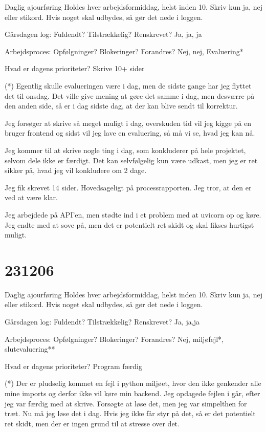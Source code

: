 \documentclass{report}
\begin{document}
Daglig ajourføring
Holdes hver arbejdsformiddag, helst inden 10. Skriv kun ja, nej eller stikord. Hvis noget skal udbydes, så gør det nede i loggen.
 
Gårsdagen log: Fuldendt? Tilstrækkelig? Renskrevet?
Ja, ja, ja
 
Arbejdsproces: Opfølgninger? Blokeringer? Forandres?
Nej, nej, Evaluering*
 
Hvad er dagens prioriteter?
Skrive 10+ sider
 
(*) Egentlig skulle evalueringen være i dag, men de sidste gange har jeg flyttet det til onsdag. Det ville give mening at gøre det samme i dag, men desværre på den anden side, så er i dag sidste dag, at der kan blive sendt til korrektur.
 
Jeg forsøger at skrive så meget muligt i dag, overskuden tid vil jeg kigge på en bruger frontend og sidst vil jeg lave en evaluering, så må vi se, hvad jeg kan nå.
 
Jeg kommer til at skrive nogle ting i dag, som konkluderer på hele projektet, selvom dele ikke er færdigt.
Det kan selvfølgelig kun være udkast, men jeg er ret sikker på, hvad jeg vil konkludere om 2 dage.
 
Jeg fik skrevet 14 sider. Hovedsageligt på processrapporten.
Jeg tror, at den er ved at være klar.
 
Jeg arbejdede på API'en, men stødte ind i et problem med at uvicorn op og køre. Jeg endte med at sove på, men det er potentielt ret skidt og skal fikses hurtigst muligt.

\section{231206}
Daglig ajourføring
Holdes hver arbejdsformiddag, helst inden 10. Skriv kun ja, nej eller stikord. Hvis noget skal udbydes, så gør det nede i loggen.

Gårsdagen log: Fuldendt? Tilstrækkelig? Renskrevet?
Ja, ja,ja

Arbejdsproces: Opfølgninger? Blokeringer? Forandres?
Nej, miljøfejl*, slutevaluering**

Hvad er dagens prioriteter?
Program færdig

(*) Der er pludselig kommet en fejl i python miljøet, hvor den ikke genkender alle mine imports og derfor ikke vil køre min backend.
Jeg opdagede fejlen i går, efter jeg var færdig med at skrive. Forsøgte at løse det, men jeg var simpelthen for træt. Nu må jeg løse det i dag. 
Hvis jeg ikke får styr på det, så er det potentielt ret skidt, men der er ingen grund til at stresse over det.
\end{document}
